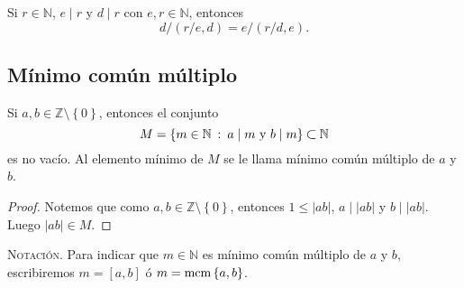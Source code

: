 \begin{corollary}\label{cor:mcd1}
Si $r \in \mathbb{N}$, $e \mid r$ y $d \mid r$ con $e,r \in \mathbb{N}$, entonces
\begin{equation*}
    d/\left( r/e,d \right) = e/\left( r/d,e \right).
\end{equation*}
\end{corollary}

\subsection{Mínimo común múltiplo}

\begin{proposition}[y definición]\label{prop:mcm1}
Si $a,b\in \mathbb{Z}\setminus \left\{0\right\}$, entonces el conjunto 
\begin{equation*}
	M=\left\{m\in \mathbb{N} \: : \: a \mid m\textnormal{ y }b \mid m\right\}\subset \mathbb{N}
\end{equation*}
es no vacío. Al elemento mínimo de $M$ se le llama mínimo común múltiplo de $a$ y $b$.
\end{proposition}

\begin{proof}
Notemos que como $a,b\in \mathbb{Z}\setminus \left\{0\right\}$, entonces $1\leq |a b|$, $a \mid |a b|$ y $b \mid |a b|$. Luego $|a b|\in M$.
\end{proof}
\textsc{Notación}. Para indicar que $m\in \mathbb{N}$ es mínimo común múltiplo de $a$ y $b$, escribiremos $m=[a,b]$ ó $m=\textnormal{mcm}\left\{a,b\right\}$.

